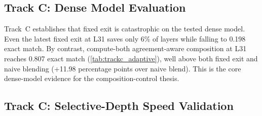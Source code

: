 \documentclass[11pt]{article}
\begin{document}
\subsection{Track C: Dense Model Evaluation}

\begin{table}[t]
\centering
\small
\caption{Track~C adaptive benchmark on Gemma~3 4B-IT.}
\label{tab:trackc_adaptive}
\end{table}

Track~C establishes that fixed exit is catastrophic on the tested dense model. Even the latest fixed exit at L31 saves only 6\% of layers while falling to 0.198 exact match. By contrast, compute-both agreement-aware composition at L31 reaches 0.807 exact match (\cref{tab:trackc_adaptive}), well above both fixed exit and naive blending (+11.98 percentage points over naive blend). This is the core dense-model evidence for the composition-control thesis.

\subsection{Track C: Selective-Depth Speed Validation}

\begin{table}[t]
\centering
\small
\caption{Selective-depth benchmark at L31. All numbers should be compared to the full-depth row within this table, as they come from a dedicated selective-depth runtime.}
\label{tab:trackc_selective}
\end{table}
\end{document}
